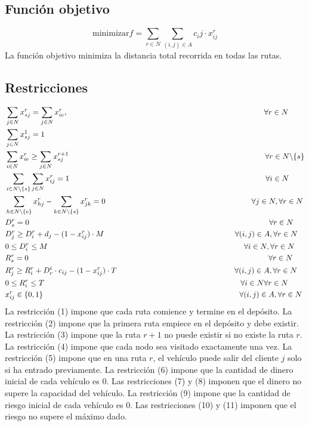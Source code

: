 \documentclass{article}
\begin{document}
\subsection{Función objetivo}
$$\text{minimizar} f = \sum_{r \in N}\sum_{(i,j) \in A} c_ij \cdot x^r_{ij}$$
La función objetivo minimiza la distancia total recorrida en todas las rutas.
\subsection{Restricciones}
\begin{align}
    & \sum_{j\in N} x^r_{sj} = \sum_{j\in N} x^r_{ie}, \hspace{9cm} \forall r\in N\\
    &\sum_{j \in N}x_{sj}^1 = 1\\
    &\sum_{i \in N}x_{ie}^r \geq \sum_{j \in N}x_{sj}^{r + 1} \hspace{9cm} \forall r\in N \backslash \{s\}\\
    &\sum_{i \in N \backslash \{s\}}\sum_{j \in N}x_{ij}^r = 1 \hspace{9cm} \forall i\in N \\
    &\sum_{h \in N \backslash \{e\}}x_{hj}^r - \sum_{k \in N \backslash \{s\}}x_{jk}^r = 0 \hspace{6.7cm} \forall j\in N, \forall r \in N\\
    &D^r_s = 0 \hspace{11cm} \forall r\in N\\
    & D^r_j \geq D^r_i + d_j - (1 - x^r_{ij}) \cdot M \hspace{6cm} \forall (i,j) \in A, \forall r \in N\\
    & 0 \leq D_i^r \leq M \hspace{9cm} \forall i\in N, \forall r\in N\\
    & R^r_s = 0 \hspace{11cm} \forall r \in N\\
    & R^r_j \geq R^r_i + D_r^i \cdot c_{ij} - (1 - x^r_{ij}) \cdot T \hspace{5.4cm} \forall (i,j) \in A, \forall r \in N\\
    &0 \leq R_i^r \leq T \hspace{9cm} \forall i \in N \forall r \in N \\
    &x_{ij} ^r \in \{0,1\}\hspace{9cm} \forall (i,j) \in A, \forall r \in N
\end{align}
 La restricción (1) impone que cada ruta comience y termine en el depósito. La restricción (2) impone que la primera ruta empiece en el depósito y debe existir. La restricción (3) impone que la ruta $r+1$ no puede existir si no existe la ruta $r$. La restricción (4) impone que cada nodo sea visitado exactamente una vez. La restricción (5) impone que en una ruta $r$, el vehículo puede salir del cliente $j$ solo si ha entrado previamente. La restricción (6) impone que la cantidad de dinero inicial de cada vehículo es 0. Las restricciones (7) y (8) imponen que el dinero no supere la capacidad del vehículo. 
 La restricción (9) impone que la cantidad de riesgo inicial de cada vehículo es 0. Las restricciones (10) y (11) imponen que el riesgo no supere el máximo dado. 
\newpage
\end{document}
